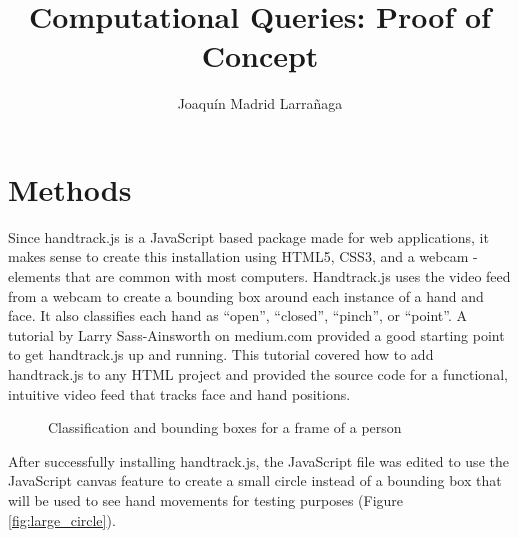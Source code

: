 \documentclass[10pt,twocolumn]{article}
\title{Computational Queries: Proof of Concept}
\author{Joaquín Madrid Larrañaga}
\affiliation{Occidental College}
\begin{document}
\maketitle

\section{Methods}
Since handtrack.js \cite{} is a JavaScript based package made for web applications, it makes sense to create this installation using HTML5, CSS3, and a webcam - elements that are common with most computers.   Handtrack.js uses the video feed from a webcam to create a bounding box around each instance of a hand and face.  It also classifies each hand as ``open'', ``closed'', ``pinch'', or ``point''.  A tutorial by Larry Sass-Ainsworth on medium.com \cite{} provided a good starting point to get handtrack.js up and running.  This tutorial covered how to add handtrack.js to any HTML project and provided the source code for a functional, intuitive video feed that tracks face and hand positions. 

\begin{figure}[hbh]
\begin{center}
\vspace{.5cm}
\caption{Classification and bounding boxes for a frame of a person}
\label{fig:bounding_boxes}
\end{center}
\end{figure}

After successfully installing handtrack.js, the JavaScript file was edited to use the JavaScript canvas feature to create a small circle instead of a bounding box that will be used to see hand movements for testing purposes (Figure \ref{fig:large_circle}). 
\end{document}

